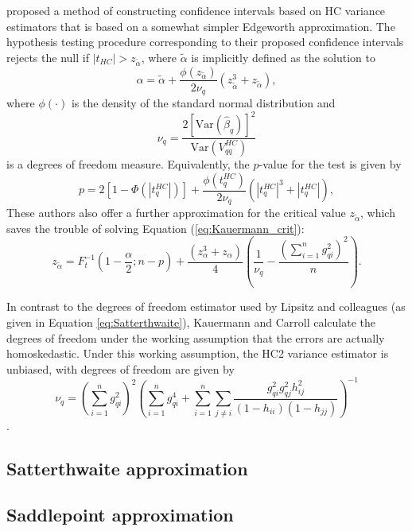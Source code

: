 \documentclass[12pt]{article}\usepackage[]{graphicx}\usepackage[]{color}
\newcommand{\Var}{\text{Var}}
\begin{document}
\citet{Kauermann2001note} proposed a method of constructing confidence intervals based on HC variance estimators that is based on a somewhat simpler Edgeworth approximation. The hypothesis testing procedure corresponding to their proposed confidence intervals rejects the null if $\left|t_{HC} \right| > z_{\tilde\alpha}$, where $\tilde\alpha$ is implicitly defined as the solution to \begin{equation}
\label{eq:Kauermann_crit}
\alpha = \tilde\alpha + \frac{\phi\left(z_{\tilde\alpha}\right)}{2 \nu_q}\left(z_{\tilde\alpha}^3 + z_{\tilde\alpha}\right), 
\end{equation}
where $\phi(\cdot)$ is the density of the standard normal distribution and \[
\nu_q  = \frac{2 \left[\Var(\hat\beta_q)\right]^2}{\Var\left(V^{HC}_{qq}\right)}\] 
is a degrees of freedom measure. Equivalently, the $p$-value for the test is given by \[
p = 2 \left[1 - \Phi\left(|t^{HC}_q|\right)\right] + \frac{\phi\left(t^{HC}_q\right)}{2 \nu_q}\left(\left|t^{HC}_q\right|^3 + \left|t^{HC}_q\right|\right), \]
These authors also offer a further approximation for the critical value $z_{\tilde\alpha}$, which saves the trouble of solving Equation (\ref{eq:Kauermann_crit}):
\[
z_{\tilde\alpha} = F_t^{-1}\left(1 - \frac{\alpha}{2}; n - p\right) + \frac{\left(z_\alpha^3 + z_\alpha\right)}{4}\left(\frac{1}{\nu_q} - \frac{\left(\sum_{i=1}^n g_{qi}^2\right)^2}{n}\right). \]

In contrast to the degrees of freedom estimator used by Lipsitz and colleagues (as given in Equation \ref{eq:Satterthwaite}), Kauermann and Carroll calculate the degrees of freedom under the working assumption that the errors are actually homoskedastic. Under this working assumption, the HC2 variance estimator is unbiased, with degrees of freedom are given by \[
\nu_q = \left(\sum_{i=1}^n g_{qi}^2\right)^2\left(\sum_{i=1}^n g_{qi}^4 + \sum_{i=1}^n \sum_{j \neq i} \frac{g_{qi}^2 g_{qj}^2 h_{ij}^2}{(1 - h_{ii})(1 - h_{jj})}\right)^{-1} \].

\subsection{Satterthwaite approximation} 

\citet{Lipsitz1999degrees}

\subsection{Saddlepoint approximation}

\citet{McCaffrey2006improved}
\end{document}
